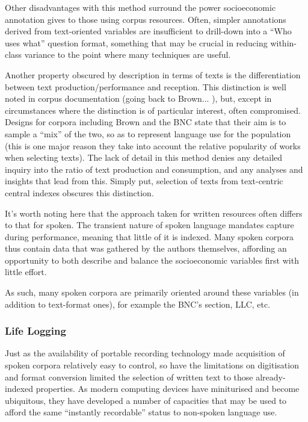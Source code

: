 Other disadvantages with this method surround the power socioeconomic annotation gives to those using corpus resources.  Often, simpler annotations derived from text-oriented variables are insufficient to drill-down into a ``Who uses what'' question format, something that may be crucial in reducing within-class variance to the point where many techniques are useful.

Another property obscured by description in terms of texts is the differentiation between text production/performance and reception.  This distinction is well noted in corpus documentation (going back to Brown... %
), but, except in circumstances where the distinction is of particular interest, often compromised.  Designs for corpora including Brown and the BNC state that their aim is to sample a ``mix'' of the two, so as to represent language use for the population (this is one major reason they take into account the relative popularity of works when selecting texts).  The lack of detail in this method denies any detailed inquiry into the ratio of text production and consumption, and any analyses and insights that lead from this.  Simply put, selection of texts from text-centric central indexes obscures this distinction.


It's worth noting here that the approach taken for written resources often differs to that for spoken.  The transient nature of spoken language mandates capture during performance, meaning that little of it is indexed.  Many spoken corpora thus contain data that was gathered by the authors themselves, affording an opportunity to both describe and balance the socioeconomic variables first with little effort.

As such, many spoken corpora are primarily oriented around these variables (in addition to text-format ones), for example the BNC's section, LLC, etc.  


\subsubsection{Life Logging}
Just as the availability of portable recording technology made acquisition of spoken corpora relatively easy to control, so have the limitations on digitisation and format conversion limited the selection of written text to those already-indexed properties.  As modern computing devices have miniturised and become ubiquitous, they have developed a number of capacities that may be used to afford the same ``instantly recordable'' status to non-spoken language use.


